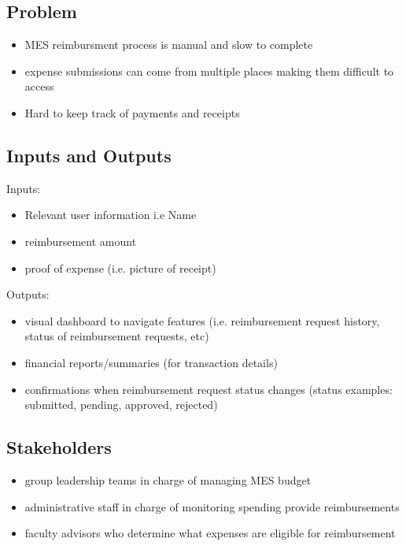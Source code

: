 \documentclass{article}
\begin{document}


\subsection{Problem}
\begin{itemize}
    \item MES reimbursment process is manual and slow to complete
    \item expense submissions can come from multiple places making them difficult to access
    \item Hard to keep track of payments and receipts
  \end{itemize}

\subsection{Inputs and Outputs}
Inputs: 
\begin{itemize}
  \item Relevant user information i.e Name
  \item reimbursement amount
  \item proof of expense (i.e. picture of receipt)
\end{itemize}
Outputs:
\begin{itemize}
  \item visual dashboard to navigate features (i.e. reimbursement request history, status of reimbursement requests, etc)
  \item financial reports/summaries (for transaction details)
  \item confirmations when reimbursement request status changes (status examples: submitted, pending, approved, rejected)
\end{itemize}



\subsection{Stakeholders}
\begin{itemize}
  \item group leadership teams in charge of managing MES budget
  \item administrative staff in charge of monitoring spending provide reimbursements
  \item faculty advisors who determine what expenses are eligible for reimbursement
\end{itemize}
\end{document}
